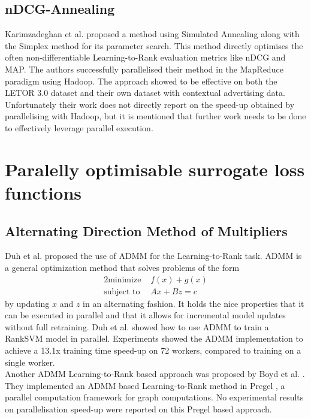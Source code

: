 \subsection{nDCG-Annealing}
Karimzadeghan et al. \cite{Karimzadehgan2011} proposed a method using Simulated Annealing along with the Simplex method for its parameter search. This method directly optimises the often non-differentiable Learning-to-Rank evaluation metrics like \ac{nDCG} and \ac{MAP}. The authors successfully parallelised their method in the MapReduce paradigm using Hadoop. The approach showed to be effective on both the LETOR 3.0 dataset and their own dataset with contextual advertising data. Unfortunately their work does not directly report on the speed-up obtained by parallelising  with Hadoop, but it is mentioned that further work needs to be done to effectively leverage parallel execution.\\

\section{Paralelly optimisable surrogate loss functions}
\subsection{Alternating Direction Method of Multipliers}
Duh et al. \cite{Duh2011} proposed the use of \ac{ADMM} for the Learning-to-Rank task. \ac{ADMM} is a general optimization method that solves problems of the form
\begin{alignat*}{2}
\text{minimize }   &  f(x) + g(x) \\
\text{subject to } &  Ax + Bz = c
\end{alignat*}
by updating $x$ and $z$ in an alternating fashion. It holds the nice properties that it can be executed in parallel and that it allows for incremental model updates without full retraining. Duh et al. \cite{Duh2011} showed how to use \ac{ADMM} to train a Rank\ac{SVM} \cite{Herbrich1999, Joachims2002} model in parallel. Experiments showed the \ac{ADMM} implementation to achieve a 13.1x training time speed-up on 72 workers, compared to training on a single worker.\\

Another \ac{ADMM} Learning-to-Rank based approach was proposed by Boyd et al. \cite{Boyd2012}. They implemented an \ac{ADMM} based Learning-to-Rank method in Pregel \cite{Malewicz2010}, a parallel computation framework for graph computations. No experimental results on parallelisation speed-up were reported on this Pregel based approach.
